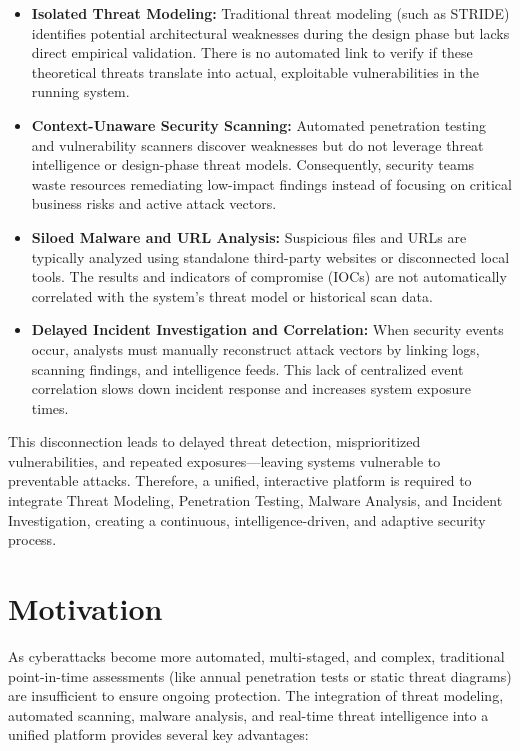 \begin{itemize}
    \item \textbf{Isolated Threat Modeling:} Traditional threat modeling (such as STRIDE) identifies potential architectural weaknesses during the design phase but lacks direct empirical validation. There is no automated link to verify if these theoretical threats translate into actual, exploitable vulnerabilities in the running system.
    \item \textbf{Context-Unaware Security Scanning:} Automated penetration testing and vulnerability scanners discover weaknesses but do not leverage threat intelligence or design-phase threat models. Consequently, security teams waste resources remediating low-impact findings instead of focusing on critical business risks and active attack vectors.
    \item \textbf{Siloed Malware and URL Analysis:} Suspicious files and URLs are typically analyzed using standalone third-party websites or disconnected local tools. The results and indicators of compromise (IOCs) are not automatically correlated with the system's threat model or historical scan data.
    \item \textbf{Delayed Incident Investigation and Correlation:} When security events occur, analysts must manually reconstruct attack vectors by linking logs, scanning findings, and intelligence feeds. This lack of centralized event correlation slows down incident response and increases system exposure times.
\end{itemize}

This disconnection leads to delayed threat detection, misprioritized vulnerabilities, and repeated exposures---leaving systems vulnerable to preventable attacks. Therefore, a unified, interactive platform is required to integrate Threat Modeling, Penetration Testing, Malware Analysis, and Incident Investigation, creating a continuous, intelligence-driven, and adaptive security process.

\section{Motivation}

As cyberattacks become more automated, multi-staged, and complex, traditional point-in-time assessments (like annual penetration tests or static threat diagrams) are insufficient to ensure ongoing protection. The integration of threat modeling, automated scanning, malware analysis, and real-time threat intelligence into a unified platform provides several key advantages:

